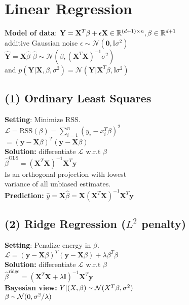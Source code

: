 \section*{Linear Regression}
\textbf{Model of data}:
$\mathbf{Y}=\mathbf{X}^T\beta +\epsilon \\
\mathbf{X}\in\mathbb{R}^{(d+1)\times n}, \beta \in \mathbb{R}^{d+1}$\\
additive Gaussian noise $\epsilon \sim \mathcal{N}(\mathbf{0},\mathbb{I}\sigma^2)$\\
$\hat{\mathbf{Y}}=\mathbf{X}\hat{\beta}$ \quad
$\hat{\beta} \sim \mathcal{N}(\beta, (\mathbf{X}^T\mathbf{X})^{-1}\sigma^2) $ \\
and $p(\mathbf{Y}|\mathbf{X},\beta, \sigma^2) = \mathcal{N}(\mathbf{Y}|\mathbf{X}^T\beta, \mathbb{I}\sigma^2)$



\subsection*{(1) Ordinary Least Squares}
\textbf{Setting}: Minimize RSS.\\
$\mathcal{L} = \text{RSS}(\beta)=\sum_{i=1}^n(y_i-x_i^T\beta)^2$\\
$=(\mathbf{y}-\mathbf{X}\beta)^T(\mathbf{y}-\mathbf{X}\beta)$\\
\textbf{Solution:} differentiate $\mathcal{L}$ w.r.t $\beta$\\
$\hat{\beta}^\text{OLS} = (\mathbf{X}^T\mathbf{X})^{-1}\mathbf{X}^{T}\mathbf{y}$\\
Is an orthogonal projection with lowest \\
variance of all unbiased estimates.\\
\textbf{Prediction:} $\hat{y}{=}\mathbf{X}\hat{\beta}{=}\mathbf{X}(\mathbf{X}^T\mathbf{X})^{-1}\mathbf{X}^{T}\mathbf{y}$


\subsection*{(2) Ridge Regression ($L^2$ penalty)}
\textbf{Setting}: Penalize energy in $\beta$.\\
$\mathcal{L} = (\mathbf{y}-\mathbf{X}\beta)^T(\mathbf{y}-\mathbf{X}\beta)+\lambda\beta^T\beta$\\
\textbf{Solution:} differentiate $\mathcal{L}$ w.r.t $\beta$\\
$\hat{\beta}^\text{ridge} = (\mathbf{X}^T\mathbf{X}+\lambda\mathbb{I})^{-1}\mathbf{X}^{T}\mathbf{y}$ \\
\textbf{Bayesian view:} $Y|(X, \beta) \smallsim \mathcal{N}(X^T\beta, \sigma^2)$\\
$ \beta \smallsim \mathcal{N}(0, \sigma^2/\lambda)$

